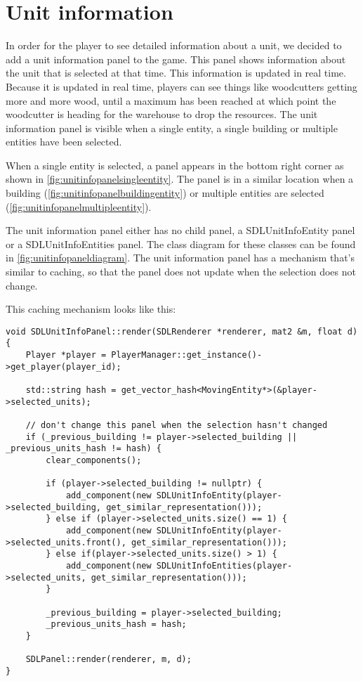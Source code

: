 \section{Unit information}

In order for the player to see detailed information about a unit, we decided to add a unit information panel to the game. This panel shows information about the unit that is selected at that time. This information is updated in real time. Because it is updated in real time, players can see things like woodcutters getting more and more wood, until a maximum has been reached at which point the woodcutter is heading for the warehouse to drop the resources. The unit information panel is visible when a single entity, a single building or multiple entities have been selected.

When a single entity is selected, a panel appears in the bottom right corner as shown in \cref{fig:unitinfopanelsingleentity}. The panel is in a similar location when a building (\cref{fig:unitinfopanelbuildingentity}) or multiple entities are selected (\cref{fig:unitinfopanelmultipleentity}).

The unit information panel either has no child panel, a SDLUnitInfoEntity panel or a SDLUnitInfoEntities panel. The class diagram for these classes can be found in \cref{fig:unitinfopaneldiagram}. The unit information panel has a mechanism that's similar to caching, so that the panel does not update when the selection does not change.

This caching mechanism looks like this:

\begin{lstlisting}[caption={Unit information panel}]
void SDLUnitInfoPanel::render(SDLRenderer *renderer, mat2 &m, float d) {
    Player *player = PlayerManager::get_instance()->get_player(player_id);

    std::string hash = get_vector_hash<MovingEntity*>(&player->selected_units);

    // don't change this panel when the selection hasn't changed
    if (_previous_building != player->selected_building || _previous_units_hash != hash) {
        clear_components();

        if (player->selected_building != nullptr) {
            add_component(new SDLUnitInfoEntity(player->selected_building, get_similar_representation()));
        } else if (player->selected_units.size() == 1) {
            add_component(new SDLUnitInfoEntity(player->selected_units.front(), get_similar_representation()));
        } else if(player->selected_units.size() > 1) {
            add_component(new SDLUnitInfoEntities(player->selected_units, get_similar_representation()));
        }

        _previous_building = player->selected_building;
        _previous_units_hash = hash;
    }

    SDLPanel::render(renderer, m, d);
}
\end{lstlisting}

